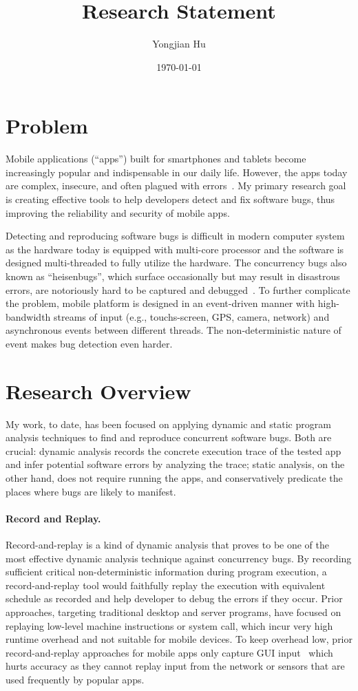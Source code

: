 \documentclass[12pt]{article}
\title{Research Statement}
\author{Yongjian Hu}
\date{\today}
\newcommand{\mypara}[1]{\paragraph*{#1.}}
\newcommand{\mysection}[1]{\section*{#1}}
\begin{document}

\mysection{Problem}

Mobile applications (``apps'') built for smartphones and tablets become increasingly
popular and indispensable in our daily life. However, the apps today are complex,
insecure, and often plagued with errors~\cite{ease15zhou}. My primary research goal
is creating effective tools to help developers detect and fix software bugs, thus
improving the reliability and security of mobile apps.

Detecting and reproducing software bugs is difficult in modern computer system as
the hardware today is equipped with multi-core processor and the software is designed
multi-threaded to fully utilize the hardware. The concurrency bugs also known
as ``heisenbugs'', which surface occasionally but may result in disastrous errors,
 are notoriously hard to be captured and debugged~\cite{osdi08musuvathi}.
To further complicate the problem, mobile platform is designed in an event-driven 
manner with high-bandwidth streams of input (e.g., touchs-screen,
GPS, camera, network) and asynchronous events between different threads. The
non-deterministic nature of event makes bug detection even harder.


\mysection{Research Overview}

My work, to date, has been focused on applying dynamic and static program analysis
techniques to find and reproduce concurrent software bugs. Both are crucial:
dynamic analysis records the concrete execution trace of the tested app and infer
potential software errors by analyzing the trace; static analysis, on the other hand,
does not require running the apps, and conservatively predicate the places where bugs
are likely to manifest.

\mypara{Record and Replay}
Record-and-replay is a kind of dynamic analysis that  proves to be one of the 
most effective dynamic analysis technique against concurrency bugs. 
By recording sufficient critical non-deterministic information
during program execution, a record-and-replay tool would faithfully replay the execution
with equivalent schedule as recorded and help developer to debug the errors if they occur.
Prior approaches, targeting traditional desktop and server programs, have focused on 
replaying low-level machine instructions or system call, which incur very high runtime 
overhead and not suitable for mobile devices. To keep overhead low, prior record-and-replay
approaches for mobile apps only capture GUI input~\cite{icse13gomez} which hurts accuracy
as they cannot replay input from the network or sensors that are used frequently by
popular apps.
\end{document}
